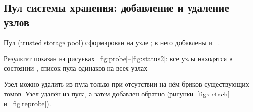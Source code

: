 \subsection{Пул системы хранения: добавление и удаление узлов}

Пул (trusted storage pool) сформирован на узле ; в него добавлены  и ~\cite{gluster-pools}.

Результат показан на рисунках~\ref{fig:probe}--\ref{fig:status2}: все узлы находятся в состоянии , список пула одинаков на всех узлах.


Узел можно удалить из пула только при отсутствии на нём бриков существующих томов. Узел  удалён из пула, а затем добавлен обратно (рисунки~\ref{fig:detach} и~\ref{fig:reprobe}).

